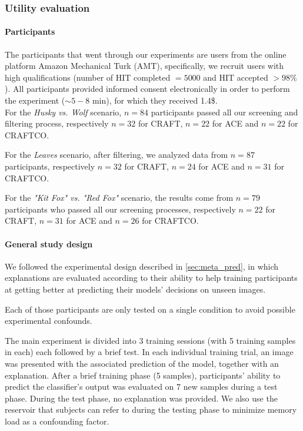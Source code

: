 \subsubsection{Utility evaluation}
\label{app:craft:utility}

\paragraph{Participants}
The participants that went through our experiments are users from the online platform Amazon Mechanical Turk (AMT), specifically, we recruit users with high qualifications (number of HIT completed $=5 000$ and HIT accepted $> 98 \%$). All participants provided informed consent electronically in order to perform the experiment ($\sim 5 - 8$ min), for which they received 1.4\$.\\

For the \textit{Husky vs. Wolf} scenario, $n=84$ participants passed all our screening and filtering process, respectively $n=32$ for CRAFT, $n=22$ for ACE and $n=22$ for CRAFTCO.


For the \textit{Leaves} scenario, after filtering, we analyzed data from $n=87$ participants, respectively $n=32$ for CRAFT, $n=24$ for ACE and $n=31$ for CRAFTCO.


For the \textit{"Kit Fox" vs. "Red Fox"} scenario, the results come from $n=79$ participants who passed all our screening processes, respectively $n=22$ for CRAFT, $n=31$ for ACE and $n=26$ for CRAFTCO.

\paragraph{General study design}
We followed the experimental design described in \autoref{sec:meta_pred}, in which explanations are evaluated according to their ability to help training participants at getting better at predicting their models' decisions on unseen images.

Each of those participants are only tested on a single condition to avoid possible experimental confounds. 

The main experiment is divided into 3 training sessions (with 5 training samples in each) each followed by a brief test. In each individual training trial, an image was presented with the associated prediction of the model, together with an explanation. After a brief training phase (5 samples), participants' ability to predict the classifier's output was evaluated on 7 new samples during a test phase. During the test phase, no explanation was provided.
We also use the reservoir that subjects can refer to during the testing phase to minimize memory load as a confounding factor.

